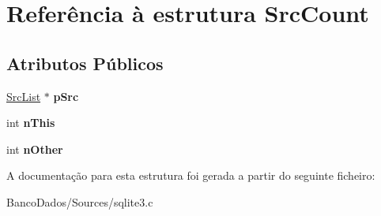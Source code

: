 \hypertarget{struct_src_count}{\section{Referência à estrutura Src\-Count}
\label{struct_src_count}
}
\subsection*{Atributos Públicos}
\begin{DoxyCompactItemize}
\item 
\hypertarget{struct_src_count_a7087f00bcaed39cc5032462d7262f4ff}{\hyperlink{struct_src_list}{Src\-List} $\ast$ {\bfseries p\-Src}}\label{struct_src_count_a7087f00bcaed39cc5032462d7262f4ff}

\item 
\hypertarget{struct_src_count_a1aaa40ff75460ebc7778ea63aca14d4d}{int {\bfseries n\-This}}\label{struct_src_count_a1aaa40ff75460ebc7778ea63aca14d4d}

\item 
\hypertarget{struct_src_count_a5666f8571b2877fdadfe95364ffb5b80}{int {\bfseries n\-Other}}\label{struct_src_count_a5666f8571b2877fdadfe95364ffb5b80}

\end{DoxyCompactItemize}


A documentação para esta estrutura foi gerada a partir do seguinte ficheiro\-:\begin{DoxyCompactItemize}
\item 
Banco\-Dados/\-Sources/sqlite3.\-c\end{DoxyCompactItemize}
